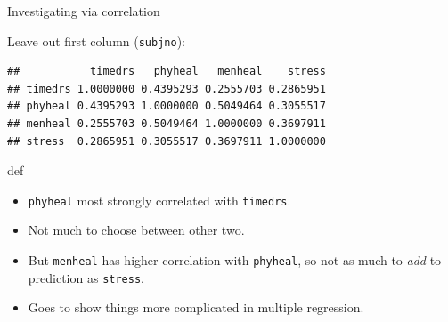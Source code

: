 \documentclass[ignorenonframetext,]{beamer}
\newenvironment{Shaded}{\begin{snugshade}}{\end{snugshade}}
\newcommand{\KeywordTok}[1]{\textcolor[rgb]{0.13,0.29,0.53}{\textbf{#1}}}
\newcommand{\NormalTok}[1]{#1}
\newcommand{\OperatorTok}[1]{\textcolor[rgb]{0.81,0.36,0.00}{\textbf{#1}}}
\newcommand{\StringTok}[1]{\textcolor[rgb]{0.31,0.60,0.02}{#1}}
\begin{document}
\begin{frame}[fragile]{Investigating via correlation}
\protect\hypertarget{investigating-via-correlation}{}

Leave out first column (\texttt{subjno}):

\begin{Shaded}
\end{Shaded}

\begin{verbatim}
##           timedrs   phyheal   menheal    stress
## timedrs 1.0000000 0.4395293 0.2555703 0.2865951
## phyheal 0.4395293 1.0000000 0.5049464 0.3055517
## menheal 0.2555703 0.5049464 1.0000000 0.3697911
## stress  0.2865951 0.3055517 0.3697911 1.0000000
\end{verbatim}

def

\begin{itemize}
\item
  \texttt{phyheal} most strongly correlated with \texttt{timedrs}.
\item
  Not much to choose between other two.
\item
  But \texttt{menheal} has higher correlation with \texttt{phyheal}, so
  not as much to \emph{add} to prediction as \texttt{stress}.
\item
  Goes to show things more complicated in multiple regression.
\end{itemize}

\end{frame}
\end{document}

